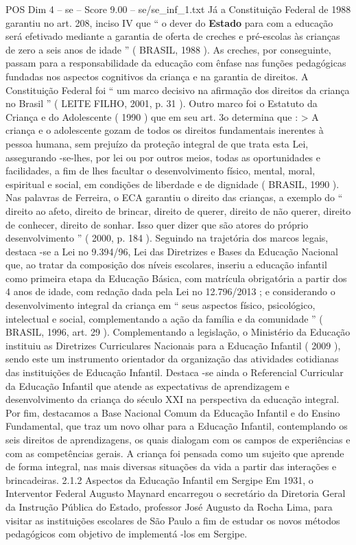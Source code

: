 \begin{textsample}{POS Dim 4 – se – Score 9.00 – se/se\_inf\_1.txt}
Já a Constituição Federal de 1988 garantiu no art. 208, inciso IV que “ o dever do \textbf{Estado} para com a educação será efetivado mediante a garantia de oferta de creches e pré-escolas às crianças de zero a seis anos de idade ” ( BRASIL, 1988 ).
As creches, por conseguinte, passam para a responsabilidade da educação com ênfase nas funções pedagógicas fundadas nos aspectos cognitivos da criança e na garantia de direitos.
A Constituição Federal foi “ um marco decisivo na afirmação dos direitos da criança no Brasil ” ( LEITE FILHO, 2001, p. 31 ).
Outro marco foi o Estatuto da Criança e do Adolescente ( 1990 ) que em seu art. 3o determina que : > A criança e o adolescente gozam de todos os direitos fundamentais inerentes à pessoa humana, sem prejuízo da proteção integral de que trata esta Lei, assegurando -se-lhes, por lei ou por outros meios, todas as oportunidades e facilidades, a fim de lhes facultar o desenvolvimento físico, mental, moral, espiritual e social, em condições de liberdade e de dignidade ( BRASIL, 1990 ).
Nas palavras de Ferreira, o ECA garantiu o direito das crianças, a exemplo do “ direito ao afeto, direito de brincar, direito de querer, direito de não querer, direito de conhecer, direito de sonhar.
Isso quer dizer que são atores do próprio desenvolvimento ” ( 2000, p. 184 ).
Seguindo na trajetória dos marcos legais, destaca -se a Lei no 9.394/96, Lei das Diretrizes e Bases da Educação Nacional que, ao tratar da composição dos níveis escolares, inseriu a educação infantil como primeira etapa da Educação Básica, com matrícula obrigatória a partir dos 4 anos de idade, com redação dada pela Lei no 12.796/2013 ; e considerando o desenvolvimento integral da criança em “ seus aspectos físico, psicológico, intelectual e social, complementando a ação da família e da comunidade ” ( BRASIL, 1996, art. 29 ).
Complementando a legislação, o Ministério da Educação instituiu as Diretrizes Curriculares Nacionais para a Educação Infantil ( 2009 ), sendo este um instrumento orientador da organização das atividades cotidianas das instituições de Educação Infantil.
Destaca -se ainda o Referencial Curricular da Educação Infantil que atende as expectativas de aprendizagem e desenvolvimento da criança do século XXI na perspectiva da educação integral.
Por fim, destacamos a Base Nacional Comum da Educação Infantil e do Ensino Fundamental, que traz um novo olhar para a Educação Infantil, contemplando os seis direitos de aprendizagens, os quais dialogam com os campos de experiências e com as competências gerais.
A criança foi pensada como um sujeito que aprende de forma integral, nas mais diversas situações da vida a partir das interações e brincadeiras. 2.1.2 Aspectos da Educação Infantil em Sergipe Em 1931, o Interventor Federal Augusto Maynard encarregou o secretário da Diretoria Geral da Instrução Pública do Estado, professor José Augusto da Rocha Lima, para visitar as instituições escolares de São Paulo a fim de estudar os novos métodos pedagógicos com objetivo de implementá -los em Sergipe.

\end{textsample}

